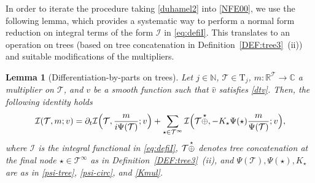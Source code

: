 \documentclass[a4paper,
11pt,  reqno]{amsart}
\makeatletter
\newcommand{\5}{\textup{V}}
\newcommand{\ft}{\widehat}
\newcommand{\dt}{\partial_t}
\newtheorem{lemma}[theorem]{Lemma}
\theoremstyle{remark}
\newcommand{\R}{\mathbb{R}}
\newcommand{\bbC}{\mathbb{C}}
\newcommand{\TT}{\mathcal{T}}
\newcommand{\Tr}{\mathrm{T}}
\newcommand{\N}{\mathbb{N}}
\def\<#1>{\csname MH@symb@#1\endcsname}
\newcommand{\Ical}{\mathcal{I}}
\numberwithin{equation}{section}
\numberwithin{theorem}{section}
\makeatother
\begin{document}
In order to iterate the procedure taking \eqref{duhamel2} into \eqref{NFE00}, we use the following lemma, which provides a systematic way to perform a normal form reduction on integral terms of the form $\Ical$ in \eqref{eq:defiI}. This translates to an operation on trees (based on tree concatenation in Definition~\ref{DEF:tree3}~(ii)) and suitable modifications of the multipliers.


\begin{lemma}[Differentiation-by-parts on trees]
\label{LEM:IBP}
Let $j\in\N$, $\TT\in\Tr_j$, $m: \R^{\TT}\to \bbC$ a multiplier on $\TT$,
and $v$ be a smooth function such that $\ft v$ satisfies  \eqref{dtv}. Then, the following identity holds
\begin{align}\label{IBP}
\begin{split}
\Ical (\TT,m; v)
= \dt \Ical \Big(\TT,\frac{m}{ i \Psi(\TT)} ; v \Big)
+ \sum_{\star \in \TT^\infty} \Ical
\Big(\TT \overset{\star}{\oplus} \<1>
, - K_\star \Psi(\star) \frac{m}{\Psi(\TT)} ; v \Big)
,
\end{split}
\end{align}
where $\Ical$ is the integral  functional in \eqref{eq:defiI}, $\TT \overset{\star}{\oplus} \<1> $ denotes tree concatenation at the final node $\star\in \TT^\infty$ as in Definition~\ref{DEF:tree3}~(ii), and $\Psi(\TT), \Psi(\star),  K_\star$ are as in \eqref{psi-tree}, \eqref{psi-circ}, and \eqref{Kmul}.

\end{lemma}
\end{document}
